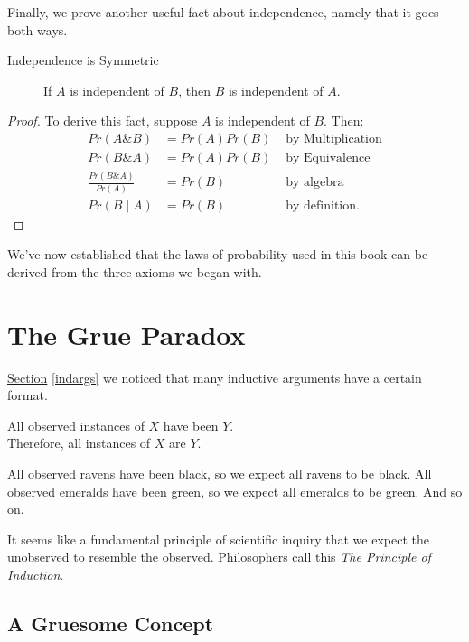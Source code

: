 \documentclass[justified]{tufte-book}
\newcommand{\given}{\mid}
\renewcommand{\wedge}{\mathbin{\&}}
\newcommand{\p}{Pr}
\theoremstyle{definition}
\theoremstyle{definition}
\theoremstyle{definition}
\theoremstyle{definition}
\theoremstyle{remark}
\begin{document}
Finally, we prove another useful fact about independence, namely that it goes both ways.

\begin{description}
\item[Independence is Symmetric]
If \(A\) is independent of \(B\), then \(B\) is independent of \(A\).
\end{description}

\begin{proof}
{}
To derive this fact, suppose \(A\) is independent of \(B\). Then:
\[
  \begin{aligned}
    \p(A \wedge B)               &= \p(A) \p(B) & \mbox{ by Multiplication}\\
    \p(B \wedge A)               &= \p(A) \p(B) & \mbox{ by Equivalence}\\
    \frac{\p(B \wedge A)}{\p(A)} &= \p(B)       & \mbox{ by algebra}\\
    \p(B \given A)               &= \p(B)       & \mbox{ by definition.}
  \end{aligned}
\]
\end{proof}

We've now established that the laws of probability used in this book can be derived from the three axioms we began with.

\hypertarget{grue}{%
\chapter{The Grue Paradox}\label{grue}}

 \protect\hyperlink{indargs}{Section} \ref{indargs} we noticed that many inductive arguments have a certain format.

\begin{argument}
All observed instances of \(X\) have been \(Y\).\\
Therefore, all instances of \(X\) are \(Y\).
\end{argument}

All observed ravens have been black, so we expect all ravens to be black. All observed emeralds have been green, so we expect all emeralds to be green. And so on.

It seems like a fundamental principle of scientific inquiry that we expect the unobserved to resemble the observed. Philosophers call this \emph{The Principle of Induction}.

\hypertarget{a-gruesome-concept}{%
\section*{A Gruesome Concept}\label{a-gruesome-concept}}
\end{document}
